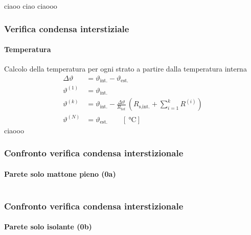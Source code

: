 \documentclass[aspectratio=141,10pt]{beamer}
\begin{document}
\begin{frame}{ciaoo}
    ciao 
    \pause
    ciaooo
\end{frame}
\begin{frame}
    \frametitle{Verifica condensa interstiziale}
    \framesubtitle{Temperatura}
Calcolo della temperatura per ogni strato a partire dalla temperatura interna 
    \begin{align*}
        \Delta\vartheta &= \vartheta_{\text{int.}} - \vartheta_{\text{est.}} \\
        \vartheta^{(1)} &= \vartheta_{\text{int.}} \\
        \vartheta^{(k)} &= \vartheta_{\text{int.}} - \frac{\Delta\vartheta}{R_{tot}} \, \left(R_{\text{s,int.}} + \sum_{i=1}^{k}R^{(i)}\right) \\
        \vartheta^{(N)} &= \vartheta_{\text{est.}} \qquad \left[\SI{}{\celsius}\right]
    \end{align*}
    \pause
    ciaooo
\end{frame}
\begin{frame}
    \frametitle{Confronto verifica condensa interstizionale}
    \framesubtitle{Parete solo mattone pieno (0a)}
    \begin{columns}
        \begin{column}{0.45\textwidth}
            \resizebox{\textwidth}{!}{%
            
            }
        \end{column}
        \pause
        \begin{column}{0.55\textwidth}
            \scriptsize
            
        \end{column}
    \end{columns}
\end{frame}
\begin{frame}
    \frametitle{Confronto verifica condensa interstizionale}
    \framesubtitle{Parete solo isolante (0b)}
    \begin{columns}
        \begin{column}{0.45\textwidth}
            \resizebox{\textwidth}{!}{%
            
            }
        \end{column}
        \begin{column}{0.55\textwidth}
            \scriptsize
            
        \end{column}
    \end{columns}
\end{frame}
\end{document}
